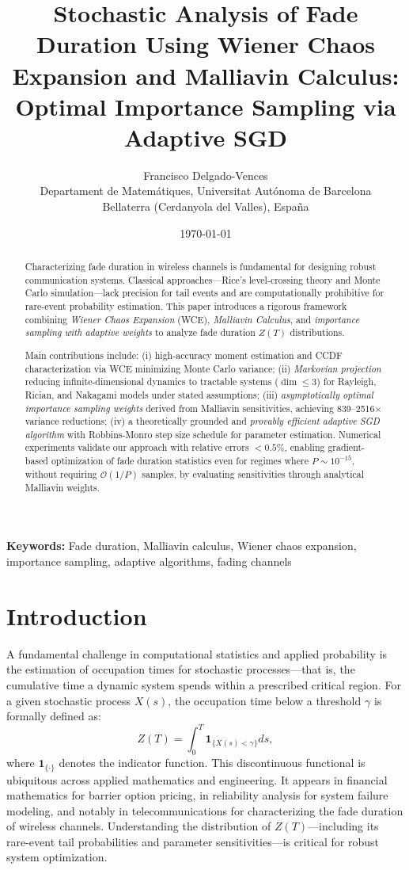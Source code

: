 \documentclass[11pt]{article}
\title{Stochastic Analysis of Fade Duration Using Wiener Chaos Expansion and Malliavin Calculus: Optimal Importance Sampling via Adaptive SGD}
\author{Francisco Delgado-Vences\\
Departament de Matemátiques, Universitat Autónoma de Barcelona\\
Bellaterra (Cerdanyola del Valles), España}
\date{\today}
\begin{document}
\maketitle

\begin{abstract}
Characterizing fade duration in wireless channels is fundamental for designing robust communication systems. Classical approaches—Rice's level-crossing theory and Monte Carlo simulation—lack precision for tail events and are computationally prohibitive for rare-event probability estimation. This paper introduces a rigorous framework combining \emph{Wiener Chaos Expansion} (WCE), \emph{Malliavin Calculus}, and \emph{importance sampling with adaptive weights} to analyze fade duration $Z(T)$ distributions. 

Main contributions include: (i) high-accuracy moment estimation and CCDF characterization via WCE minimizing Monte Carlo variance; (ii) \emph{Markovian projection} reducing infinite-dimensional dynamics to tractable systems ($\dim \leq 3$) for Rayleigh, Rician, and Nakagami models under stated assumptions; (iii) \emph{asymptotically optimal importance sampling weights} derived from Malliavin sensitivities, achieving 839--2516$\times$ variance reductions; (iv) a theoretically grounded and \emph{provably efficient adaptive SGD algorithm} with Robbins-Monro step size schedule for parameter estimation. Numerical experiments validate our approach with relative errors $< 0.5\%$, enabling gradient-based optimization of fade duration statistics even for regimes where $P \sim 10^{-15}$, without requiring $\mathcal{O}(1/P)$ samples, by evaluating sensitivities through analytical Malliavin weights.

\end{abstract}

\noindent
\textbf{Keywords:} Fade duration, Malliavin calculus, Wiener chaos expansion, importance sampling, adaptive algorithms, fading channels

\section{Introduction}
\label{sec:introduction}

A fundamental challenge in computational statistics and applied probability is the estimation of occupation times for stochastic processes---that is, the cumulative time a dynamic system spends within a prescribed critical region. For a given stochastic process $X(s)$, the occupation time below a threshold $\gamma$ is formally defined as:
\begin{equation}\label{eq:occupation_time}
    Z(T) = \int_0^T \mathbf{1}_{\{X(s) < \gamma\}} ds,
\end{equation}
where $\mathbf{1}_{\{\cdot\}}$ denotes the indicator function. This discontinuous functional is ubiquitous across applied mathematics and engineering. It appears in financial mathematics for barrier option pricing, in reliability analysis for system failure modeling, and notably in telecommunications for characterizing the fade duration of wireless channels. Understanding the distribution of $Z(T)$---including its rare-event tail probabilities and parameter sensitivities---is critical for robust system optimization.
\end{document}
